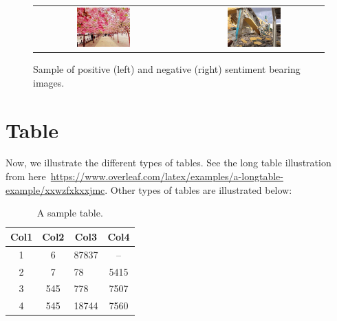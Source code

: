 \documentclass[11pt]{article}
\begin{document}
\begin{figure}[!htb]
\centering
\begin{tabular}{cp{0.5cm}c}
\includegraphics[width=0.4\textwidth]{Pos4.jpg}
&
&\includegraphics[width=0.4\textwidth]{Neg3.jpg}
\end{tabular}
\caption{Sample of positive (left) and negative (right) sentiment bearing images.}
\label{Fig:sampleImage}
\end{figure}

\section{Table}
\label{ref:table}
Now, we illustrate the different types of tables. See the long table illustration from here~\url{https://www.overleaf.com/latex/examples/a-longtable-example/xxwzfxkxxjmc}. Other types of tables are illustrated below:

\begin{table}[!h]
\centering
\caption{A sample table.}
\begin{tabular}{|c|c|l|c|} 
\hline
\textbf{Col1} & \textbf{Col2} & \multicolumn{1}{c|}{\textbf{Col3}} & \textbf{Col4} \\
\hline
1 & 6 & 87837 & --\\ 
\hline
2 & 7 & 78 & 5415 \\
\hline
3 & 545 & 778 & 7507 \\
\hline
4 & 545 & 18744 & 7560 \\
\hline
\end{tabular}
\end{table}
\end{document}
